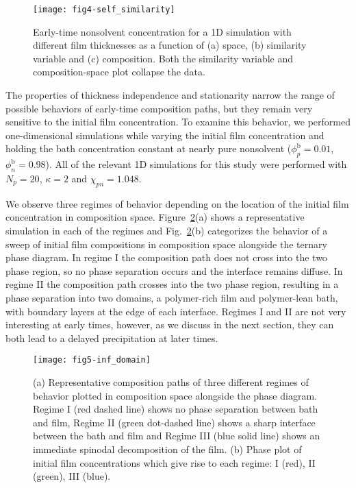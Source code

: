 \documentclass[journal=mamobx, layout=twocolumn]{achemso}
\newcommand{\txtb}{\mathrm{b}}
\begin{document}
\begin{figure}[tbp]
  \texttt{[image: fig4-self\_similarity]}
    \caption{
Early-time nonsolvent concentration for a 1D simulation with different film thicknesses as a function of (a) space, (b) similarity variable and (c) composition.
Both the similarity variable and composition-space plot collapse the data.
}
  \label{fig-self_similarity}
\end{figure}

The properties of thickness independence and stationarity narrow the range of possible behaviors of early-time composition paths, but they remain very sensitive to the initial film concentration.
To examine this behavior, we performed one-dimensional simulations while varying the initial film concentration and holding the bath concentration constant at nearly pure nonsolvent ($\phi_{p}^{\txtb} = 0.01$, $\phi_{n}^{\txtb} = 0.98$).
All of the relevant 1D simulations for this study were performed with $N_{p} = 20$, $\kappa = 2$ and $\chi_{pn} = 1.048$.

We observe three regimes of behavior depending on the location of the initial film concentration in composition space.
Figure~\ref{fig-inf_domain}(a) shows a representative simulation in each of the regimes and Fig.~\ref{fig-inf_domain}(b) categorizes the behavior of a sweep of initial film compositions in composition space alongside the ternary phase diagram.
In regime I the composition path does not cross into the two phase region, so no phase separation occurs and the interface remains diffuse.
In regime II the composition path crosses into the two phase region, resulting in a phase separation into two domains, a polymer-rich film and polymer-lean bath, with boundary layers at the edge of each interface.
Regimes I and II are not very interesting at early times, however, as we discuss in the next section, they can both lead to a delayed precipitation at later times.

\begin{figure}[tbp]
  \texttt{[image: fig5-inf\_domain]}
    \caption{(a) Representative composition paths of three different regimes of behavior plotted in composition space alongside the phase diagram.
Regime I (red dashed line) shows no phase separation between bath and film, Regime II (green dot-dashed line) shows a sharp interface between the bath and film and Regime III (blue solid line) shows an immediate spinodal decomposition of the film.
(b) Phase plot of initial film concentrations which give rise to each regime: I (red), II (green), III (blue).
}
  \label{fig-inf_domain}
\end{figure}
\end{document}
